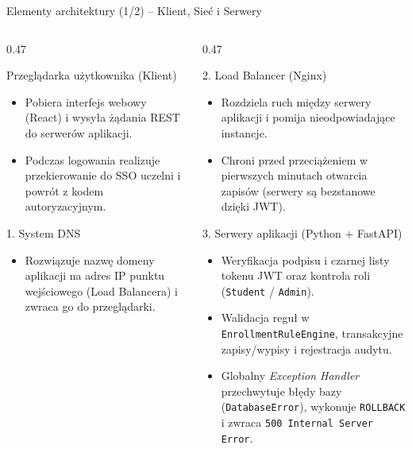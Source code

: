 \documentclass[aspectratio=169, 10pt, xcolor=table]{beamer}
\begin{document}
\begin{frame}{Elementy architektury (1/2) -- Klient, Sieć i Serwery}
    \footnotesize
    \begin{columns}[T, onlytextwidth]
        \begin{column}{0.47\textwidth}
            \begin{block}{Przeglądarka użytkownika (Klient)}
                \begin{itemize}
                    \item Pobiera interfejs webowy (React) i wysyła żądania REST do serwerów aplikacji.
                    \item Podczas logowania realizuje przekierowanie do SSO uczelni i powrót z kodem autoryzacyjnym.
                \end{itemize}
            \end{block}
            \begin{block}{1. System DNS}
                \begin{itemize}
                    \item Rozwiązuje nazwę domeny aplikacji na adres IP punktu wejściowego (Load Balancera) i zwraca go do przeglądarki.
                \end{itemize}
            \end{block}
        \end{column}
        \begin{column}{0.47\textwidth}
            \begin{block}{2. Load Balancer (Nginx)}
                \begin{itemize}
                    \item Rozdziela ruch między serwery aplikacji i pomija nieodpowiadające instancje.
                    \item Chroni przed przeciążeniem w pierwszych minutach otwarcia zapisów (serwery są bezstanowe dzięki JWT).
                \end{itemize}
            \end{block}
            \begin{block}{3. Serwery aplikacji (Python + FastAPI)}
                \begin{itemize}
                    \item Weryfikacja podpisu i czarnej listy tokenu JWT oraz kontrola roli (\texttt{Student} / \texttt{Admin}).
                    \item Walidacja reguł w \texttt{EnrollmentRuleEngine}, transakcyjne zapisy/wypisy i rejestracja audytu.
                    \item Globalny \textit{Exception Handler} przechwytuje błędy bazy (\texttt{DatabaseError}), wykonuje \texttt{ROLLBACK} i zwraca \texttt{500 Internal Server Error}.
                \end{itemize}
            \end{block}
        \end{column}
    \end{columns}
\end{frame}
\end{document}
